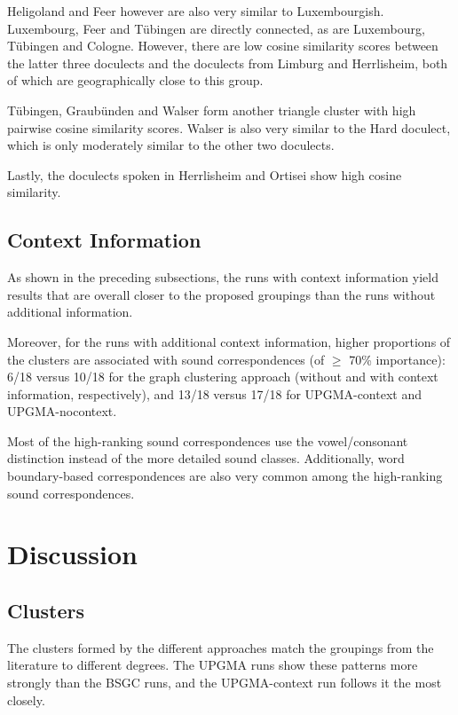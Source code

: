 \documentclass[a4paper]{article}
\begin{document}
Heligoland and Feer however are also very similar to Luxembourgish.
Luxembourg, Feer and T\"{u}bingen are directly connected,
as are Luxembourg, T\"{u}bingen and Cologne.
However, there are low cosine similarity scores between
the latter three doculects and
the doculects from Limburg and Herrlisheim,
both of which are geographically close to this group.

T\"{u}bingen, Graub\"{u}nden and Walser form another
triangle cluster with high pairwise cosine similarity scores.
Walser is also very similar to the Hard doculect,
which is only moderately similar to the other two doculects.

Lastly, the doculects spoken in Herrlisheim and Ortisei
show high cosine similarity.

\subsection{Context Information}

As shown in the preceding subsections,
the runs with context information yield results
that are overall closer to the proposed groupings
than the runs without additional information.

Moreover, for the runs with additional context information,
higher proportions of the clusters are associated with
sound correspondences (of $\geq$ 70\% importance):
6/18 versus 10/18 for the graph clustering approach
(without and with context information, respectively),
and 13/18 versus 17/18 for UPGMA-context and UPGMA-nocontext.

Most of the high-ranking sound correspondences
use the vowel/consonant distinction instead of
the more detailed sound classes.
Additionally, word boundary-based correspondences are also very common
among the high-ranking sound correspondences.

\section{Discussion}
\label{sec:discussion}

\subsection{Clusters}
The clusters formed by the different approaches
match the groupings from the literature to different degrees.
The UPGMA runs show these patterns more strongly than the BSGC runs,
and the UPGMA-context run follows it the most closely.
\end{document}
